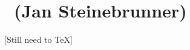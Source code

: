 \renewcommand{\thespeaker}{Jan Steinebrunner}
\renewcommand{\thetitle}{}
\section{\thetitle~(\thespeaker)}
\providecommand{\Supp}{\text{Supp}}

[Still need to TeX]
